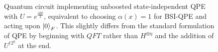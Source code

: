 \documentclass[aps,floatfix,10pt,amssymb,amsfont,amsmath,superscriptaddress,float,nofootinbib,longbibliography,nobalancelastpage,twocolumn]{revtex4-2}
\begin{document}
\begin{figure}

\caption{Quantum circuit implementing unboosted state-independent QPE with $U=e^{\frac{iHt}{2}}$, equivalent to choosing $\alpha(x)=1$ for BSI-QPE and acting upon $\ket{0}_F$. This slightly differs from the standard formulation of QPE \cite{Nielsen_Chuang_2010} by beginning with $QFT$ rather than $H^{\otimes \eta}$ and the addition of $U^{\dagger 2^{\eta}}$ at the end. }
\label{fig:standard_qpe}
\end{figure}
\end{document}
